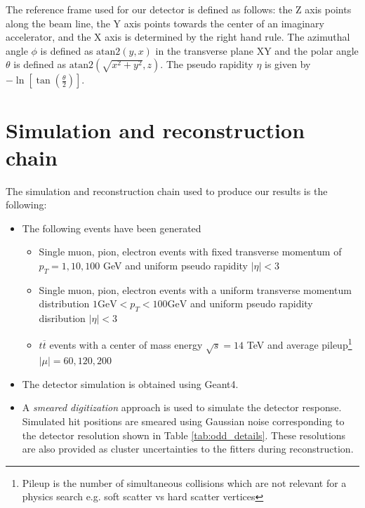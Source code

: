 \documentclass[10pt, paper=a4, UKenglish]{article}
\begin{document}
The reference frame used for our detector is defined as follows: the Z axis points along the beam line, the Y axis points towards the center of an imaginary accelerator, and the X axis is determined by the right hand rule. The azimuthal angle $\phi$ is defined as $\text{atan2}\left(y,x\right)$ in the transverse plane XY and the polar angle $\theta$ is defined as $\text{atan2}\left(\sqrt{x^2+y^2},z\right)$. The pseudo rapidity $\eta$ is given by $-\ln\left[\tan\left(\frac{\theta}{2}\right)\right]$.

\section{Simulation and reconstruction chain}
\label{reco}

The simulation and reconstruction chain used to produce our results is the following:

\begin{itemize}
  \item The following events have been generated
    \begin{itemize}
      \item Single muon, pion, electron events with fixed transverse momentum of $p_T=1,10,100$ GeV and uniform pseudo rapidity $|\eta|<3$
      \item Single muon, pion, electron events with a uniform transverse momentum distribution $1 \text{GeV} < p_T < 100 \text{GeV}$ and uniform pseudo rapidity disribution $|\eta|<3$
      \item $t\overline{t}$ events with a center of mass energy $\sqrt{s} = 14$ TeV and average pileup\footnote{Pileup is the number of simultaneous collisions which are not relevant for a physics search e.g. soft scatter vs hard scatter vertices} $|\mu|=60,120,200$
    \end{itemize}
  \item The detector simulation is obtained using Geant4.%
  \item A \textit{smeared digitization} approach is used to simulate the detector response. Simulated hit positions are smeared using Gaussian noise corresponding to the detector resolution shown in Table \ref{tab:odd_details}. These resolutions are also provided as cluster uncertainties to the fitters during reconstruction.
\end{itemize}
\end{document}
